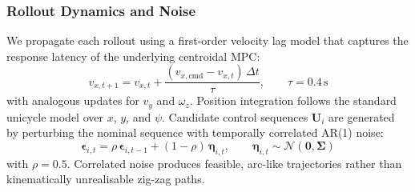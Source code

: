 \documentclass[letterpaper, 10 pt, conference]{ieeeconf}  %
\begin{document}
\subsubsection{Rollout Dynamics and Noise}
We propagate each rollout using a first-order velocity lag model that captures the response latency of the underlying centroidal MPC:
\begin{equation}
v_{x,t+1} = v_{x,t} + \frac{(v_{x,\text{cmd}} - v_{x,t})\,\Delta t}{\tau}, \qquad \tau = 0.4\,\text{s} \label{eq:lag}
\end{equation}
with analogous updates for $v_y$ and $\omega_z$. Position integration follows the standard unicycle model over $x$, $y$, and $\psi$. 
Candidate control sequences $\mathbf{U}_i$ are generated by perturbing the nominal sequence with temporally correlated AR(1) noise:
\begin{equation}
\boldsymbol{\epsilon}_{i,t} = \rho\,\boldsymbol{\epsilon}_{i,t-1} + (1-\rho)\,\boldsymbol{\eta}_{i,t}, \qquad \boldsymbol{\eta}_{i,t} \sim \mathcal{N}(\mathbf{0}, \boldsymbol{\Sigma}) \label{eq:ar1}
\end{equation}
with $\rho = 0.5$. Correlated noise produces feasible, arc-like trajectories rather than kinematically unrealisable zig-zag paths.
\end{document}
